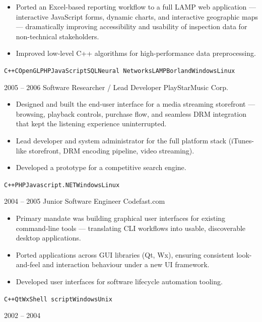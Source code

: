 \documentclass[9pt]{developercv}
\begin{document}
\begin{entrylist}
{\begin{itemize}[noitemsep,topsep=2pt,leftmargin=1em,parsep=0pt]
			  \item Ported an Excel-based reporting workflow to a full LAMP web application --- interactive JavaScript forms, dynamic charts, and interactive geographic maps --- dramatically improving accessibility and usability of inspection data for non-technical stakeholders.
			  \item Improved low-level C++ algorithms for high-performance data preprocessing.
			\end{itemize}
			\texttt{C++}\slashsep\texttt{C}\slashsep\texttt{OpenGL}\slashsep\texttt{PHP}\slashsep\texttt{JavaScript}\slashsep\texttt{SQL}\slashsep\texttt{Neural Networks}\slashsep\texttt{LAMP}\slashsep\texttt{Borland}\slashsep\texttt{Windows}\slashsep\texttt{Linux}}
	\entry
		{2005 -- 2006}
		{Software Researcher / Lead Developer}
		{PlayStarMusic Corp.}
		{\begin{itemize}[noitemsep,topsep=2pt,leftmargin=1em,parsep=0pt]
			  \item Designed and built the end-user interface for a media streaming storefront --- browsing, playback controls, purchase flow, and seamless DRM integration that kept the listening experience uninterrupted.
			  \item Lead developer and system administrator for the full platform stack (iTunes-like storefront, DRM encoding pipeline, video streaming).
			  \item Developed a prototype for a competitive search engine.
			\end{itemize}
			\texttt{C++}\slashsep\texttt{PHP}\slashsep\texttt{Javascript}\slashsep\texttt{.NET}\slashsep\texttt{Windows}\slashsep\texttt{Linux}}
	\entry
		{2004 -- 2005}
		{Junior Software Engineer}
		{Codefast.com}
		{\begin{itemize}[noitemsep,topsep=2pt,leftmargin=1em,parsep=0pt]
			  \item Primary mandate was building graphical user interfaces for existing command-line tools --- translating CLI workflows into usable, discoverable desktop applications.
			  \item Ported applications across GUI libraries (Qt, Wx), ensuring consistent look-and-feel and interaction behaviour under a new UI framework.
			  \item Developed user interfaces for software lifecycle automation tooling.
			\end{itemize}
			\texttt{C++}\slashsep\texttt{Qt}\slashsep\texttt{Wx}\slashsep\texttt{Shell script}\slashsep\texttt{Windows}\slashsep\texttt{Unix}}
	\entry
		{2002 -- 2004}

\end{entrylist}
\end{document}
